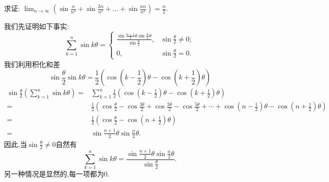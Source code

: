 \begin{exercise}[1.3.7]
    求证: $\lim_{n \to \infty} \left(\sin\frac{\alpha}{n^2} + \sin\frac{2\alpha}{n^2} + \dots + \sin\frac{n\alpha}{n^2}\right) = \frac{\alpha}{2}$.
\end{exercise}

\begin{solution}
    我们先证明如下事实:
    $$
        \sum_{k=1}^n \sin k \theta =\begin{cases}
            \frac{\sin\frac{n+1}{2}\theta\sin\frac{n}{2}\theta}{\sin \frac{\theta}{2}}, & \sin \frac{\theta}{2} \ne 0; \\
            0,                                                                          & \sin \frac{\theta}{2} = 0.
        \end{cases}
    $$
    我们利用积化和差$$\sin \frac{\theta}{2}\sin k\theta = \frac{1}{2}\left(\cos\left(k-\frac{1}{2}\right)\theta-\cos\left(k+\frac{1}{2}\right)\theta\right)$$
    \begin{align*}
        \sin \frac{\theta}{2}\left(\sum_{k=1}^n \sin k \theta \right)= & \sum_{k=1}^n \frac{1}{2}\left(\cos\left(k-\frac{1}{2}\right)\theta-\cos\left(k+\frac{1}{2}\right)\theta\right)                                                                                         \\
        =                                                              & \frac{1}{2}\left(\cos \frac{\theta}{2} -\cos \frac{3\theta}{2}+\cos \frac{3\theta}{2} -\cos \frac{5\theta}{2}+\cdots+ \cos\left(n-\frac{1}{2}\right)\theta-\cos\left(n+\frac{1}{2}\right)\theta\right) \\
        =                                                              & \frac{1}{2}\left(\cos \frac{\theta}{2} -\cos\left(n+\frac{1}{2}\right)\theta\right)                                                                                                                    \\
        =                                                              & \sin\frac{n+1}{2}\theta\sin\frac{n}{2}\theta.
    \end{align*}
    因此,当$ \sin \frac{\theta}{2}\neq 0$自然有$$
        \sum_{k=1}^n \sin k \theta =
        \frac{\sin\frac{n+1}{2}\theta\sin\frac{n}{2}\theta}{\sin \frac{\theta}{2}}.
    $$
    另一种情况是显然的,每一项都为$0$.


\end{solution}
